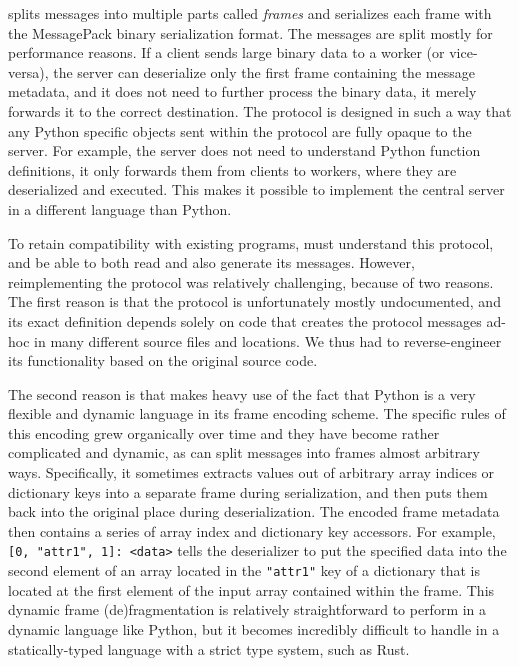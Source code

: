 \dask{} splits messages into multiple parts called \emph{frames}
and serializes each frame with the MessagePack binary serialization
format. The messages are split mostly for performance reasons. If a client sends large binary data
to a worker (or vice-versa), the server can deserialize only the first frame containing the message
metadata, and it does not need to further process the binary data, it merely forwards it to the
correct destination. The protocol is designed in such a way that any Python specific objects sent
within the protocol are fully opaque to the server. For example, the server does not need to
understand Python function definitions, it only forwards them from clients to workers, where they
are deserialized and executed. This makes it possible to implement the central server in a
different language than Python.

To retain compatibility with existing \dask{} programs,
\rsds{} must understand this protocol, and be able to both read and also
generate its messages. However, reimplementing the protocol was relatively challenging, because of
two reasons. The first reason is that the protocol is unfortunately mostly
undocumented, and its exact definition depends solely on
\dask{} code that creates the protocol messages ad-hoc in many different source
files and locations. We thus had to reverse-engineer its functionality based on the original
\dask{} source code.

The second reason is that \dask{} makes heavy use of the fact that Python is a
very flexible and dynamic language in its frame encoding scheme. The specific rules of this
encoding grew organically over time and they have become rather complicated and dynamic, as
\dask{} can split messages into frames almost arbitrary ways. Specifically, it
sometimes extracts values out of arbitrary array indices or dictionary keys into a separate frame
during serialization, and then puts them back into the original place during deserialization. The
encoded frame metadata then contains a series of array index and dictionary key accessors. For
example, \verb|[0, "attr1", 1]: <data>| tells the deserializer to put the specified data into the
second element of an array located in the \texttt{"attr1"} key of a dictionary that is
located at the first element of the input array contained within the frame. This dynamic frame
(de)fragmentation is relatively straightforward to perform in a dynamic language like Python, but
it becomes incredibly difficult to handle in a statically-typed language with a strict type system,
such as Rust.

